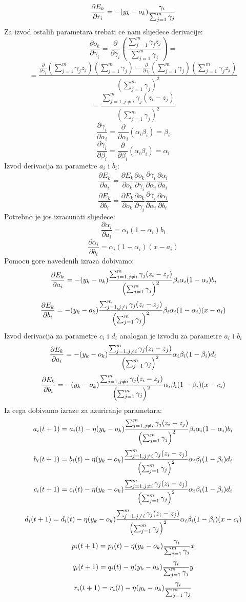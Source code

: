 \documentclass[a4paper, 11pt]{article}
\begin{document}
$$\frac{\partial E_{k}}{\partial r_{i}}=-(y_{k}-o_{k})\frac{\gamma_{i}}{\sum_{j=1}^{m}\gamma_{j}}$$
Za izvod ostalih parametara trebati ce nam slijedece derivacije:
\newcommand{\upperr}{\sum_{j=1}^{m}\gamma_{j}z_{j}}
\newcommand{\lowerr}{\sum_{j=1}^{m}\gamma_{j}}
$$\frac{\partial o_{k}}{\partial\gamma_{i}} = \frac{\partial}{\partial\gamma_{i}}\left (\frac{\upperr}{\lowerr}\right )=$$
$$= \frac{\frac{\partial}{\partial\gamma_{i}}\left (\upperr\right )\left(\lowerr\right)-\frac{\partial}{\partial\gamma_{i}}\left (\lowerr\right )\left(\upperr\right)}{\left(\lowerr\right)^{2}}$$
\newcommand{\dokdgamma}{ \frac{\sum_{j=1,j\neq i}^{m}\gamma_{j}(z_{i}-z_{j})}{\left(\lowerr\right)^{2}}}
\newcommand{\dgammadalpha}{ \beta_{i}}
\newcommand{\dgammadbeta}{\alpha_{i}}
$$=\dokdgamma$$
$$\frac{\partial \gamma_{i}}{\partial\alpha_{i}} = \frac{\partial}{\partial\alpha_{i}}\left(\alpha_{i}\beta_{i}\right)= \dgammadalpha$$
$$\frac{\partial \gamma_{i}}{\partial\beta_{i}} = \frac{\partial}{\partial\beta_{i}}\left(\alpha_{i}\beta_{i}\right)= \dgammadbeta$$
Izvod derivacija za parametre $a_{i}$ i $b_{i}$:
$$\frac{\partial E_{k}}{\partial a_{i}}=\frac{\partial E_{k}}{\partial o_{k}}\frac{\partial o_{k}}{\partial \gamma_{i}}\frac{\partial \gamma_{i}}{\partial \alpha_{i}}\frac{\partial \alpha_{i}}{\partial a_{i}}$$
$$\frac{\partial E_{k}}{\partial b_{i}}=\frac{\partial E_{k}}{\partial o_{k}}\frac{\partial o_{k}}{\partial \gamma_{i}}\frac{\partial \gamma_{i}}{\partial \alpha_{i}}\frac{\partial \alpha_{i}}{\partial b_{i}}$$
Potrebno je jos izracunati slijedece:
\newcommand{\sigmoidalphad}{\alpha_{i}(1-\alpha_{i})}
\newcommand{\dalphada}{\sigmoidalphad b_{i}}
\newcommand{\dalphadb}{\sigmoidalphad (x - a_{i})}
\newcommand{\sigmoidbetad}{\beta_{i}(1-\beta_{i})}
\newcommand{\dbetadc}{\sigmoidbetad d_{i}}
\newcommand{\dbetadd}{\sigmoidbetad (x - c_{i})}
$$\frac{\partial \alpha_{i}}{\partial a_{i}} = \dalphada$$
$$\frac{\partial \alpha_{i}}{\partial b_{i}} = \dalphadb$$
Pomocu gore navedenih izraza dobivamo:
$$\frac{\partial E_{k}}{\partial a_{i}}=-\minusdEkdok \dokdgamma \dgammadalpha \dalphada$$
$$\frac{\partial E_{k}}{\partial b_{i}}=-\minusdEkdok \dokdgamma \dgammadalpha \dalphadb$$
Izvod derivacija za parametre $c_{i}$ i $d_{i}$ analogan je izvodu za parametre $a_{i}$ i $b_{i}$ 
$$\frac{\partial E_{k}}{\partial a_{i}}=-\minusdEkdok \dokdgamma \dgammadbeta \dbetadc$$
$$\frac{\partial E_{k}}{\partial b_{i}}=-\minusdEkdok \dokdgamma \dgammadbeta \dbetadd$$
Iz cega dobivamo izraze za azuriranje parametara:
$$a_{i}(t+1) =a_{i}(t)-\eta\minusdEkdok \dokdgamma \dgammadalpha \dalphada$$
$$b_{i}(t+1) =b_{i}(t)-\eta\minusdEkdok \dokdgamma \dgammadbeta \dbetadc$$
$$c_{i}(t+1) =c_{i}(t)-\eta\minusdEkdok \dokdgamma \dgammadbeta \dbetadc$$
$$d_{i}(t+1) =d_{i}(t)-\eta\minusdEkdok \dokdgamma \dgammadbeta \dbetadd	$$
$$p_{i}(t+1) =p_{i}(t)-\eta(y_{k}-o_{k})\frac{\gamma_{i}}{\sum_{j=1}^{m}\gamma_{j}} x$$
$$q_{i}(t+1) =q_{i}(t)-\eta(y_{k}-o_{k})\frac{\gamma_{i}}{\sum_{j=1}^{m}\gamma_{j}} y$$
$$r_{i}(t+1) =r_{i}(t)-\eta(y_{k}-o_{k})\frac{\gamma_{i}}{\sum_{j=1}^{m}\gamma_{j}} $$
\end{document}
